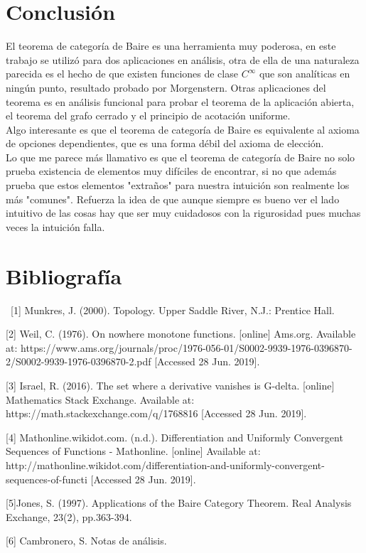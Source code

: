 \documentclass{article}
\theoremstyle{definition}
\begin{document}
\section{Conclusión}

El teorema de categoría de Baire es una herramienta muy poderosa, en este trabajo se utilizó para dos aplicaciones en análisis, otra de ella de una naturaleza parecida es el hecho de que existen funciones de clase $C^\infty$ que son analíticas en ningún punto, resultado probado por Morgenstern. Otras aplicaciones del teorema es en análisis funcional para probar el teorema de la aplicación abierta, el teorema del grafo cerrado y el principio de acotación uniforme. \\
Algo interesante es que el teorema de categoría de Baire es equivalente al axioma de opciones dependientes, que es una forma débil del axioma de elección.\\
Lo que me parece más llamativo es que el teorema de categoría de Baire no solo prueba existencia de elementos muy difíciles de encontrar, si no que además prueba que estos elementos "extraños" para nuestra intuición son realmente los más "comunes". Refuerza la idea de que aunque siempre es bueno ver el lado intuitivo de las cosas hay que ser muy cuidadosos con la rigurosidad pues muchas veces la intuición falla.  



\section{Bibliografía}
\quad \   [1] Munkres, J. (2000). Topology. Upper Saddle River, N.J.: Prentice Hall.

[2] Weil, C. (1976). On nowhere monotone functions. [online] Ams.org. Available at: https://www.ams.org/journals/proc/1976-056-01/S0002-9939-1976-0396870-2/S0002-9939-1976-0396870-2.pdf [Accessed 28 Jun. 2019].

[3] Israel, R. (2016). The set where a derivative vanishes is G-delta. [online] Mathematics Stack Exchange. Available at: https://math.stackexchange.com/q/1768816 [Accessed 28 Jun. 2019].

[4] Mathonline.wikidot.com. (n.d.). Differentiation and Uniformly Convergent Sequences of Functions - Mathonline. [online] Available at: http://mathonline.wikidot.com/differentiation-and-uniformly-convergent-sequences-of-functi [Accessed 28 Jun. 2019].

[5]Jones, S. (1997). Applications of the Baire Category Theorem. Real Analysis Exchange, 23(2), pp.363-394.

[6] Cambronero, S. Notas de análisis.
\end{document}
